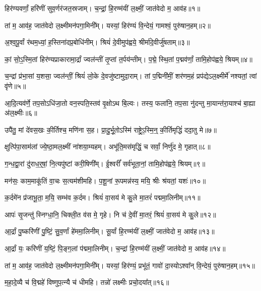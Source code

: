 

हिर॑ण्यवर्णां॒ हरि॑णीं सुव॒र्णर॑जत॒स्रजाम्।
च॒न्द्रां॒ हि॒रण्म॑यीं ल॒क्ष्मीं॒ जात॑वेदो म॒ आव॑ह॥१॥

तां म॒ आव॑ह॒ जात॑वेदो ल॒क्ष्मीमन॑पगा॒मिनी᳚म्।
यस्यां॒ हिर॑ण्यं वि॒न्देयं॒ गामश्वं॒ पुरु॑षान॒हम्॥२॥

अ॒श्व॒पू॒र्वां र॑थम॒ध्यां॒ ह॒स्तिना॑दप्र॒बोधि॑नीम्।
श्रियं॑ दे॒वीमुप॑ह्वये॒ श्रीर्मा॑दे॒वीर्जु॑षताम्॥३॥

कां॒ सो॒ऽ॒स्मि॒तां हिर॑ण्यप्राकारामा॒र्द्रां ज्वल॑न्तीं तृ॒प्तां त॒र्पय॑न्तीम्।
प॒द्मे॒ स्थि॒तां प॒द्मव॑र्णां॒ तामि॒होप॑ह्वये॒ श्रियम्॥४॥

च॒न्द्रां प्र॑भा॒सां य॒शसा॒ ज्वल॑न्तीं॒ श्रियं॑ लो॒के दे॒वजु॑ष्टामुदा॒राम्।
तां प॒द्मिनी॑मीं॒ शर॑णम॒हं प्रप॑द्येऽल॒क्ष्मीर्मे॑ नश्यतां॒ त्वां वृ॑णे॥५॥

आ॒दि॒त्यव॑र्णे॒ तप॒सोऽधि॑जा॒तो वन॒स्पति॒स्तव॑ वृ॒क्षोऽथ बि॒ल्वः।
तस्य॒ फला॑नि॒ तप॒सा नु॑दन्तु मा॒यान्त॑रा॒याश्च॑ बा॒ह्या अ॑ल॒क्ष्मीः॥६॥

उपै॑तु॒ मां दे॑वस॒खः की॒र्तिश्च॒ मणि॑ना स॒ह।
प्रा॒दु॒र्भू॒तोऽस्मि॑ राष्ट्रे॒ऽ॒स्मि॒न्॒ की॒र्तिमृद्धिं॑ ददा॒तु मे॥७॥

क्षुत्पि॑पा॒साम॑लां ज्ये॒ष्ठा॒मल॒क्ष्मीं ना॑शया॒म्यहम्।
अभू॑ति॒\-मस॑मृद्धिं॒ च सर्वां॒ निर्णु॑द मे॒ गृहात्॥८॥

ग॒न्ध॒द्वा॒रां दु॑राध॒र्॒‌षां॒ नि॒त्यपु॑ष्टां करी॒षिणी᳚म्।
ई॒श्वरीं᳚ सर्व॑भूता॒नां॒ तामि॒होप॑ह्वये॒ श्रियम्॥९॥

मन॑सः॒ काम॒माकू॑तिं वा॒चः स॒त्यम॑शीमहि।
प॒शू॒नां रू॒पमन्न॑स्य॒ मयि॒ श्रीः श्र॑यतां॒ यशः॑॥१०॥

क॒र्दमे॑न प्र॑जाभू॒ता॒ म॒यि॒ सम्भ॑व क॒र्दम।
श्रियं॑ वा॒सय॑ मे कु॒ले मा॒तरं॑ पद्ममा॒लिनीम्॥११॥

आपः॑ सृ॒जन्तु॑ स्निग्धा॒नि॒ चिक्ली॒त व॑स मे॒ गृहे।
नि च॑ दे॒वीं मा॒तरं॒ श्रियं॑ वा॒सय॑ मे कु॒ले॥१२॥

आ॒र्द्रां पु॒ष्करि॑णीं पु॒ष्टिं॒ सु॒व॒र्णां हे॑ममा॒लिनीम्।
सू॒र्यां हि॒रण्म॑यीं ल॒क्ष्मीं॒ जात॑वेदो म॒ आव॑ह॥१३॥

आ॒र्द्रां यः॒ करि॑णीं य॒ष्टिं॒ पि॒ङ्ग॒लां प॑द्ममा॒लिनीम्।
च॒न्द्रां हि॒रण्म॑यीं ल॒क्ष्मीं॒ जात॑वेदो म॒ आव॑ह॥१४॥

तां म॒ आव॑ह॒ जात॑वेदो ल॒क्ष्मीमन॑पगा॒मिनी᳚म्।
यस्यां॒ हिर॑ण्यं॒ प्रभू॑तं॒ गावो॑ दा॒स्योऽश्वा᳚न् वि॒न्देयं॒ पुरु॑षान॒हम्॥१५॥

म॒हा॒दे॒व्यै च॑ वि॒द्महे॑ विष्णुप॒त्न्यै च॑ धीमहि।
तन्नो॑ लक्ष्मीः प्रचो॒दया᳚त्॥१६॥